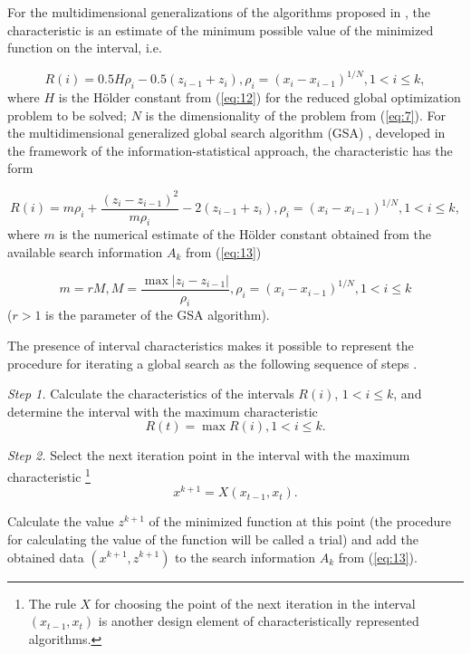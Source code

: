 \documentclass[review]{elsarticle}
\begin{document}
For the multidimensional generalizations of the algorithms proposed in \cite{c22,c23}, the characteristic is an estimate of the minimum possible value of the minimized function on the interval, i.e.

\begin{equation}\label{eq:17}
R(i)=0.5 H \rho_i - 0.5 (z_{i-1} + z_i), \rho_i=(x_i - x_{i-1})^{1/N}, 1 < i \leq k,
\end{equation}
where $H$ is the H\"older constant from (\ref{eq:12}) for the reduced global optimization problem to be solved; $N$ is the dimensionality of the problem from (\ref{eq:7}). For the multidimensional generalized global search algorithm (GSA) \cite{c5,c24}, developed in the framework of the information-statistical approach, the characteristic has the form

\begin{equation}\label{eq:18}
R(i)=m \rho_i+\frac{(z_i-z_{i-1})^2}{m \rho_i }-2(z_{i-1}+z_i ), \rho_i=(x_i-x_{i-1})^{1/N}  ,1 < i \leq k,
\end{equation}
where $m$ is the numerical estimate of the H\"older constant obtained from the available search information $A_k$ from (\ref{eq:13})

\begin{equation}\label{eq:19}
m=r M, M=\frac{\max|z_i-z_{i-1}|}{\rho_i}, \rho_i=(x_i-x_{i-1})^{1/N}  ,1 < i \leq k
\end{equation}
($r>1$ is the parameter of the GSA algorithm).

The presence of interval characteristics makes it possible to represent the procedure for iterating a global search as the following sequence of steps \cite{c5}.

\textit{Step 1.} Calculate the characteristics of the intervals $R(i)$, $1 < i \leq k$, and determine the interval with the maximum characteristic
\begin{equation}\label{eq:20}
R(t)=\max{R(i)}, 1 < i \leq k.
\end{equation}

\textit{Step 2.} Select the next iteration point in the interval with the maximum characteristic \footnote{The rule $X$ for choosing the point of the next iteration in the interval $(x_{t-1},x_t)$ is another design element of characteristically represented algorithms.}
\begin{equation}\label{eq:21}
x^{k+1}=X(x_{t-1},x_t ).
\end{equation}

Calculate the value $z^{k+1}$ of the minimized function at this point (the procedure for calculating the value of the function will be called a trial) and add the obtained data $(x^{k+1},z^{k+1})$ to the search information $A_k$ from (\ref{eq:13}).
\end{document}
